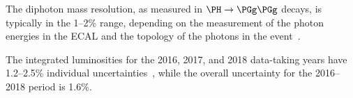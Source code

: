 The diphoton mass resolution, as measured in $\PH \to \PGg\PGg$ decays, is typically in the 1--2\% range, depending on the measurement of the photon 
energies in the ECAL and the topology of the photons in the event~\cite{CMS:2020xrn}.

The integrated luminosities for the 2016, 2017, and 2018 data-taking years have 1.2--2.5\% individual uncertainties~\cite{CMS-LUM-17-003,CMS-PAS-LUM-17-004,CMS-PAS-LUM-18-002}, 
while the overall uncertainty for the 2016--2018 period is 1.6\%.